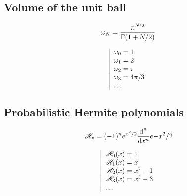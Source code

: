 \documentclass[a4paper,12pt]{article}
\begin{document}
\subsection{Volume of the unit ball}
\begin{minipage}{0.5\linewidth}
\begin{equation}\omega_N=\frac{\pi^{N/2}}{\Gamma(1+N/2)}\end{equation}
\end{minipage}
\begin{minipage}{0.5\linewidth}
\begin{equation}
  \left|
  \begin{array}{l}
    \omega_0=1 \\
    \omega_1=2 \\
    \omega_2=\pi \\
    \omega_3=4\pi/3 \\
    \dots
  \end{array}
  \right.
\end{equation}
\end{minipage}

\subsection{Probabilistic Hermite polynomials}
\begin{minipage}{0.5\linewidth}
\begin{equation}\mathscr{H}_n=(-1)^n e^{x^2/2} \frac{\text{d}^n}{\text{d}x^n}e{-x^2/2}\end{equation}
\end{minipage}
\begin{minipage}{0.5\linewidth}
\begin{equation}
  \left|
  \begin{array}{l}
    \mathscr{H}_0(x)=1 \\
    \mathscr{H}_1(x)=x \\
    \mathscr{H}_2(x)=x^2-1 \\
    \mathscr{H}_3(x)=x^3-3 \\
    \dots
  \end{array}
  \right.
\end{equation}
\end{minipage}
\end{document}

